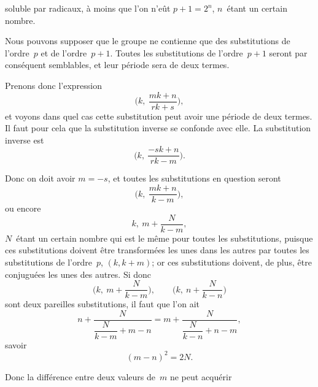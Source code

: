 soluble par radicaux, à moins que l'on n'eût $p + 1 = 2^{n}$, $n$~étant
un certain nombre.

Nous pouvons supposer que le groupe ne contienne que des
substitutions de l'ordre~$p$ et de l'ordre~$p + 1$. Toutes les substitutions
de l'ordre~$p + 1$ seront par conséquent semblables, et leur
période sera de deux termes.

Prenons donc l'expression
\[
\biggl(k,\ \frac{mk + n}{rk + s}\biggr),
\]
et voyons dans quel cas cette substitution peut avoir une période
de deux termes. Il faut pour cela que la substitution inverse se
confonde avec elle. La substitution inverse est
\[
\biggl(k,\ \frac{-sk + n}{rk - m}\biggr).
\]

Donc on doit avoir $m = -s$, et toutes les substitutions en
question seront
\[
\biggl(k,\ \frac{mk + n}{k - m}\biggr),
\]
ou encore
\[
k,\ m + \frac{N}{k - m},
\]
$N$~étant un certain nombre qui est le même pour toutes les substitutions,
puisque ces substitutions doivent être transformées les
unes dans les autres par toutes les substitutions de l'ordre~$p$,
$(k, k+m)$; or ces substitutions doivent, de plus, être conjuguées
les unes des autres. Si donc
\[
\biggl(k,\ m + \frac{N}{k - m}\biggr), \qquad
\biggl(k,\ n + \frac{N}{k - n}\biggr)
\]
sont deux pareilles substitutions, il faut que l'on ait
\[
n + \frac{N}{\dfrac{N}{k-m} + m - n} =
m + \frac{N}{\dfrac{N}{k-n} + n - m},
\]
savoir
\[
(m - n)^{2} = 2N.
\]

Donc la différence entre deux valeurs de~$m$ ne peut acquérir
